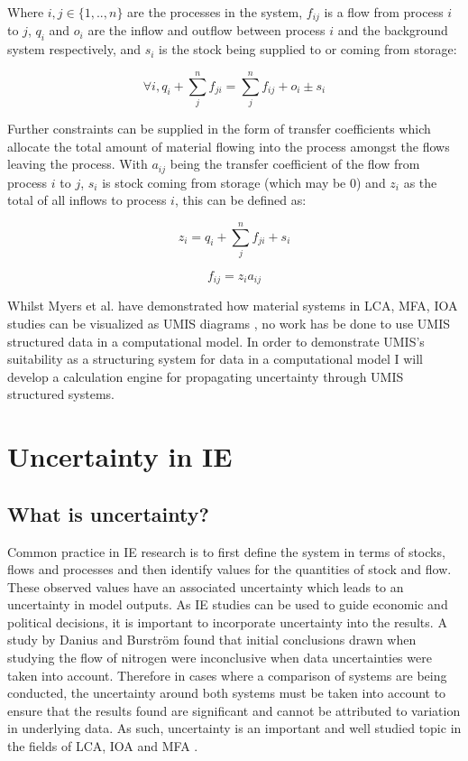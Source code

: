 \documentclass[ %
                    author={Tom Jager},
                supervisor={Dr. Daniel Schien},
                    degree={MEng},
                     title={A Bayesian Inference Engine for UMIS Structured Data},
                  subtitle={},
                      type={research},
                      year={2019} ]{dissertation}
\begin{document}
Where $i,j \in \{1,..,n\} $ are the processes in the system, $f_{ij}$ is a flow from process $i$ to $j$, $q_i$ and $o_i$ are the inflow and outflow between process $i$ and the background system respectively, and $s_i$ is the stock being supplied to or coming from storage:     

\begin{equation}
    \forall i, q_i + \sum^{n}_{j}f_{ji} = \sum^{n}_{j}f_{ij} + o_{i} \pm{s_i} 
\end{equation}

Further constraints can be supplied in the form of transfer coefficients which allocate the total amount of material flowing into the process amongst the flows leaving the process. With $a_{ij}$ being the transfer coefficient of the flow from process $i$ to $j$, $s_i$ is stock coming from storage (which may be 0) and $z_i$ as the total of all inflows to process $i$, this can be defined as:

\begin{equation}
    z_i = q_i + \sum^{n}_{j}f_{ji} + s_i
\end{equation}



\begin{equation}
    f_{ij} = z_{i}a_{ij}
\end{equation}

Whilst Myers et al. have demonstrated how material systems in LCA, MFA, IOA studies can be visualized as UMIS diagrams \cite{myers2019unified}, no work has be done to use UMIS structured data in a computational model. In order to demonstrate UMIS's suitability as a structuring system for data in a computational model I will develop a calculation engine for propagating uncertainty through UMIS structured systems.

\section{Uncertainty in IE}
\subsection{What is uncertainty?}
Common practice in IE research is to first define the system in terms of stocks, flows and processes and then identify values for the quantities of stock and flow. These observed values have an associated uncertainty which leads to an uncertainty in model outputs. As IE studies can be used to guide economic and political decisions, it is important to incorporate uncertainty into the results. A study by Danius and Burstr\"om \cite{danius2001regional} found that initial conclusions drawn when studying the flow of nitrogen were inconclusive when data uncertainties were taken into account. Therefore in cases where a comparison of systems are being conducted, the uncertainty around both systems must be taken into account to ensure that the results found are significant and cannot be attributed to variation in underlying data. As such, uncertainty is an important and well studied topic in the fields of LCA, IOA and MFA \cite{temursho201712, laner2014systematic, heijungs2004review}.
\end{document}
